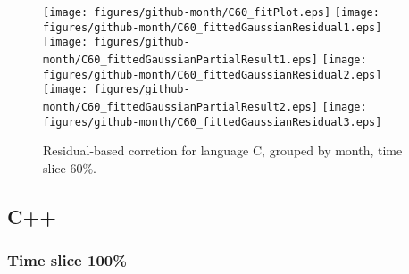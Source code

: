 \begin{figure}[hb]
\centering
{}
{\texttt{[image: figures/github-month/C60\_fitPlot.eps]}}
{\texttt{[image: figures/github-month/C60\_fittedGaussianResidual1.eps]}}
{\texttt{[image: figures/github-month/C60\_fittedGaussianPartialResult1.eps]}}
{\texttt{[image: figures/github-month/C60\_fittedGaussianResidual2.eps]}}
{\texttt{[image: figures/github-month/C60\_fittedGaussianPartialResult2.eps]}}
{\texttt{[image: figures/github-month/C60\_fittedGaussianResidual3.eps]}}
\caption{Residual-based corretion for language C, grouped by month, time slice 60\%.}
\end{figure}


\clearpage 
\newpage 


\subsection{C++}

\FloatBarrier

\subsubsection{Time slice 100\%}

